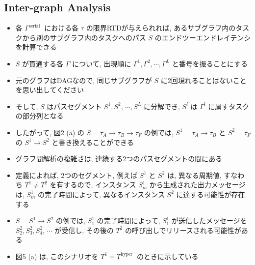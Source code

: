 \subsection{Inter-graph Analysis}
\label{ssec: inter-graph analysis}

\begin{frame}{}
    \begin{itemize}
        \item 各 $\Gamma^{\text {serial }}$ における各 $\tau$ の限界RTDが与えられれば, あるサブグラフ内のタスクから別のサブグラフ内のタスクへのパス $S$ のエンドツーエンドレイテンシを計算できる
\item $S$ が貫通する各 $\Gamma$ について, 出現順に $\Gamma^{1}, \Gamma^{2}, \cdots, \Gamma^{L}$ と番号を振ることにする
\item 元のグラフはDAGなので, 同じサブグラフが $S$ に2回現れることはないことを思い出してください
\item そして, $S$ はパスセグメント $S^{1}, S^{2}$, $\cdots, S^{L}$ に分解でき, $S^{l}$ は $\Gamma^{l}$ に属すタスクの部分列となる
\item したがって, 図2 (a) の $S=\tau_{A} \rightarrow \tau_{B} \rightarrow \tau_{F}$ の例では, $S^{1}=\tau_{A} \rightarrow \tau_{B}$ と $S^{2}=\tau_{F}$ の $S^{1} \rightarrow S^{2}$ と書き換えることができる
    \end{itemize}
\end{frame}

\begin{frame}{}
    \begin{itemize}
        \item グラフ間解析の複雑さは, 連続する2つのパスセグメントの間にある
\item 定義によれば, 2つのセグメント, 例えば $S^{1}$ と $S^{2}$ は, 異なる周期値, すなわち $T^{1} \neq T^{2}$ を有するので, インスタンス $S_{m}^{1}$ から生成された出力メッセージは, $S_{m}^{1}$ の完了時間によって, 異なるインスタンス $S^{2}$ に達する可能性が存在する
\item $S=S^{1} \rightarrow S^{2}$ の例では, $S_{1}^{1}$ の完了時間によって, $S_{1}^{1}$ が送信したメッセージを $S_{2}^{2}, S_{3}^{2}, S_{4}^{2}$, $\cdots$ が受信し, その後の $T^{2}$ の呼び出しでリリースされる可能性がある
\item 図5 (a) は, このシナリオを $T^{1}=T^{\text {hyper }}$ のときに示している
    \end{itemize}
\end{frame}


